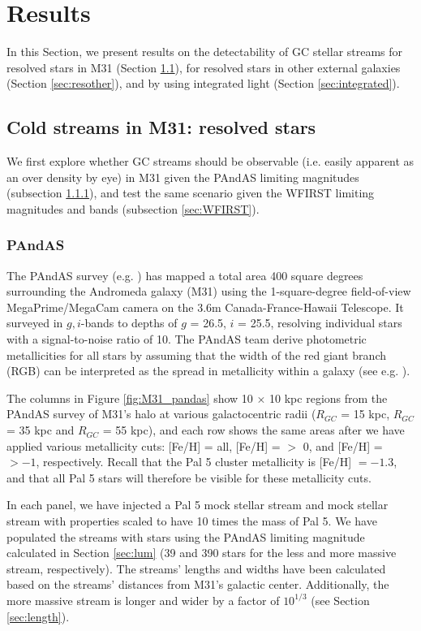 \documentclass[twocolumn]{aastex62}
\begin{document}
\section{Results}\label{sec:results}
In this Section, we present results on the detectability of GC stellar streams for resolved stars in M31 (Section \ref{sec:resolved}), for resolved stars in other external galaxies (Section \ref{sec:resother}), and by using integrated light (Section \ref{sec:integrated}). 
 

\subsection{Cold streams in M31: resolved stars}
\label{sec:resolved}
We first explore whether GC streams should be observable (i.e. easily apparent as an over density by eye)  in M31 given the PAndAS limiting magnitudes (subsection \ref{sec:PANDAS}), and test the same scenario given the WFIRST limiting magnitudes and bands (subsection \ref{sec:WFIRST}). %


\subsubsection{PAndAS}
\label{sec:PANDAS}
The PAndAS survey (e.g. \citealt{mcconnachie09}) has mapped a total area 400 square degrees surrounding the Andromeda galaxy (M31) using the 1-square-degree field-of-view MegaPrime/MegaCam camera on the 3.6m Canada-France-Hawaii Telescope. It surveyed in $g, i$-bands to depths of $g$ = 26.5, $i$ = 25.5, resolving individual stars with a signal-to-noise ratio of 10. The PAndAS team derive photometric metallicities for all stars by assuming that the width of the red giant branch (RGB) can be interpreted as the spread in metallicity within a galaxy (see e.g. \citealt{crno14}).

The columns in Figure \ref{fig:M31_pandas} show 10 $\times$ 10 kpc regions from the PAndAS survey of M31's halo at various galactocentric radii ($R_{GC}$ = 15  kpc, $R_{GC}$ = 35 kpc and $R_{GC}$ = 55 kpc), and each row shows the same areas after we have applied various metallicity cuts: [Fe/H] = all,  [Fe/H] = $>$ 0, and  [Fe/H] = $> -1 $, respectively. Recall that the Pal 5 cluster metallicity is  [Fe/H] $= -1.3$, and that all Pal 5 stars will therefore be visible for these metallicity cuts. 

In each panel, we have injected a Pal 5 mock stellar stream and mock stellar stream with properties scaled to have 10 times the mass of Pal 5. We have populated the streams with stars using the PAndAS limiting magnitude calculated in Section \ref{sec:lum} (39 and 390 stars for the less and more massive stream, respectively).  The streams' lengths and widths have been calculated based on the streams' distances from M31's galactic center. Additionally, the more massive stream is longer and wider by a factor of $10^{1/3}$ (see Section \ref{sec:length}). 
\end{document}
